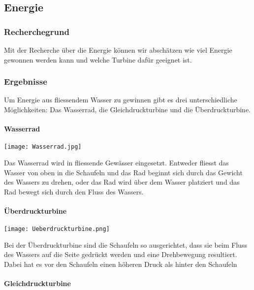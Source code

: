 \subsection{Energie}

\subsubsection{Recherchegrund}

Mit der Recherche über die Energie können wir abschätzen wie viel Energie gewonnen werden kann und welche Turbine dafür geeignet ist.

\subsubsection{Ergebnisse}

Um Energie aus fliessendem Wasser zu gewinnen gibt es drei unterschiedliche Möglichkeiten: Das Wasserrad, die Gleichdruckturbine und die Überdruckturbine. 

\paragraph{Wasserrad}

\begin{center}
\texttt{[image: Wasserrad.jpg]}
\end{center}

Das Wasserrad wird in fliessende Gewässer eingesetzt. Entweder  fliesst das Wasser von oben in die Schaufeln und das Rad beginnt sich durch das Gewicht des Wassers zu drehen, oder das Rad wird über dem Wasser platziert und das Rad bewegt sich durch den Fluss des Wassers.

\bigskip

\paragraph{Überdruckturbine}

\begin{center}
\texttt{[image: Ueberdruckturbine.png]}
\end{center}

Bei der Überdruckturbine sind die Schaufeln so ausgerichtet, dass sie beim Fluss des Wassers auf die Seite gedrückt werden und eine Drehbewegung resultiert. Dabei hat es vor den Schaufeln einen höheren Druck als hinter den Schaufeln

\paragraph{Gleichdruckturbine}


